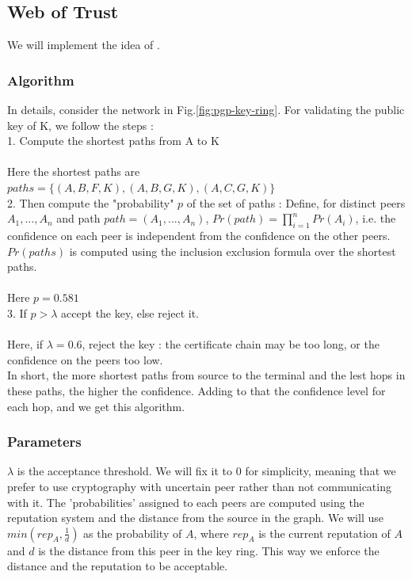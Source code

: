 \documentclass[]{article}
\begin{document}
\subsection{Web of Trust}
\label{sec:web-of-trust-spec}
We will implement the idea of \cite{haenni2007new}.

\subsubsection{Algorithm}
\label{sec:wts-algo}
In details, consider the network in Fig.\ref{fig:pgp-key-ring}. For validating the public key of K, we follow the steps : \\

1. Compute the shortest paths from A to K \\\\
Here the shortest paths are $paths = \{(A,B,F,K), (A,B,G,K), (A,C,G,K)\}$\\

2. Then compute the "probability" $p$ of the set of paths : \newline
Define, for distinct peers $A_1,...,A_n$ and path $path = (A_1,...,A_n)$, $Pr(path) = \prod_{i = 1}^{n} Pr(A_i)$, i.e. the confidence on each peer is independent from the confidence on the other peers. \\
$Pr(paths)$ is computed using the inclusion exclusion formula over the shortest paths. \\\\
Here $p = 0.581$ \\

3. If $p > \lambda$ accept the key, else reject it. \\\\
Here, if $\lambda = 0.6$, reject the key : the certificate chain may be too long, or the confidence on the peers too low.\\


In short, the more shortest paths from source to the terminal and the lest hops in these paths, the higher the confidence. Adding to that the confidence level for each hop, and we get this algorithm.

\subsubsection{Parameters}
\label{sec:parameters}
$\lambda$ is the acceptance threshold. We will fix it to 0 for simplicity, meaning that we prefer to use cryptography with uncertain peer rather than not communicating with it. \newline
The 'probabilities' assigned to each peers are computed using the reputation system and the distance from the source in the graph. We will use $min(rep_A, \frac{1}{d})$ as the probability of $A$, where $rep_A$ is the current reputation of $A$ and $d$ is the distance from this peer in the key ring. This way we enforce the distance and the reputation to be acceptable.
\end{document}
